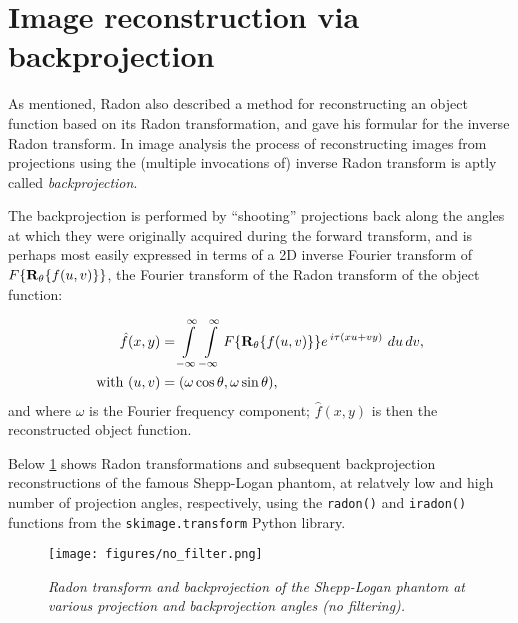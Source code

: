 \newpage
{}
\section{Image reconstruction via backprojection}


As mentioned, Radon also described a method for reconstructing an object
function based on its Radon transformation, and gave his formular for the
inverse Radon transform. In image analysis the process of reconstructing images
from projections using the (multiple invocations of) inverse Radon transform is
aptly called \textit{backprojection}.

\medskip

The backprojection is performed by ``shooting'' projections back along the
angles at which they were originally acquired during the forward transform, and
is perhaps most easily expressed in terms of a 2D inverse Fourier transform of
$F\{\mathbf{R}_\theta\{f(u, v)\}\}$, the Fourier transform of the Radon transform of
the object function:

\begin{alignat}{3}
  \hat f(x, y) &= \int\limits_{-\infty}^{\infty} \int\limits_{-\infty}^{\infty} F\{\mathbf{R}_\theta\{f(u, v)\}\} e\, ^{i\tau(xu + vy)}\
  du\,dv,\label{eq:bp}\\
   \text{with}\  (u, v) &= (\omega \cos \theta, \omega \sin \theta)\nonumber,
\end{alignat}
and where $\omega$ is the Fourier frequency component; $\hat f(x, y)$ is then the
reconstructed object function.

\medskip

Below \cref{fig:no-filter} shows Radon transformations and subsequent
backprojection reconstructions of the famous Shepp-Logan phantom, at relatvely
low and high number of projection angles, respectively, using the \texttt{radon()}
and \texttt{iradon()} functions from the \texttt{skimage.transform} Python library.

\begin{figure}[H]
  \texttt{[image: figures/no\_filter.png]}
  \vspace{-0.8cm}
  \caption{\small \textit{Radon transform and backprojection of the Shepp-Logan phantom at
  various projection and backprojection angles (no filtering).}}
\label{fig:no-filter}
\end{figure}

